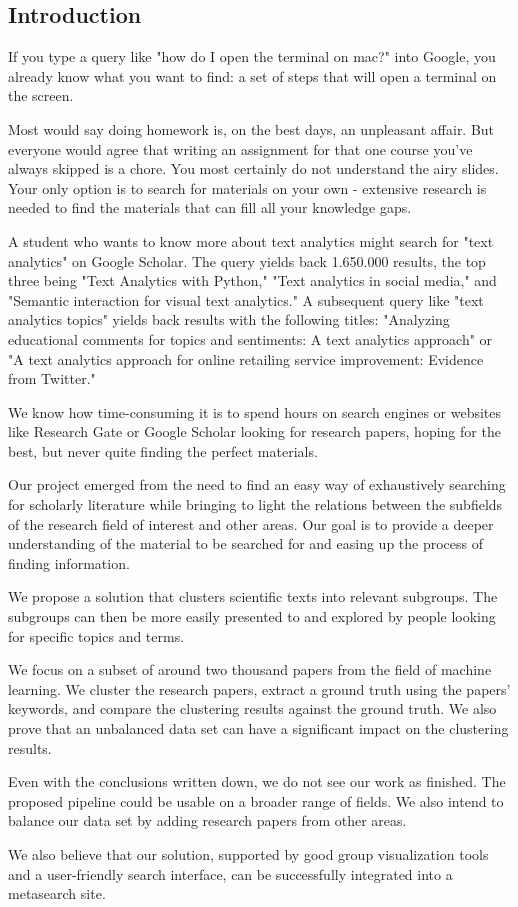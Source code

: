 \subsection{Introduction}

If you type a query like "how do I open the terminal on mac?" into Google, you already know what you want to find: a set of steps that will open a terminal on the screen.

Most would say doing homework is, on the best days, an unpleasant affair. But everyone would agree that writing an assignment for that one course you've always skipped is a chore. You most certainly do not understand the airy slides. Your only option is to search for materials on your own - extensive research is needed to find the materials that can fill all your knowledge gaps.

A student who wants to know more about text analytics might search for "text analytics" on Google Scholar. The query yields back 1.650.000 results, the top three being "Text Analytics with Python," "Text analytics in social media," and "Semantic interaction for visual text analytics." A subsequent query like "text analytics topics" yields back results with the following titles: "Analyzing educational comments for topics and sentiments: A text analytics approach" or "A text analytics approach for online retailing service improvement: Evidence from Twitter."

We know how time-consuming it is to spend hours on search engines or websites like Research Gate or Google Scholar looking for research papers, hoping for the best, but never quite finding the perfect materials.

Our project emerged from the need to find an easy way of exhaustively searching for scholarly literature while bringing to light the relations between the subfields of the research field of interest and other areas. Our goal is to provide a deeper understanding of the material to be searched for and easing up the process of finding information.

We propose a solution that clusters scientific texts into relevant subgroups. The subgroups can then be more easily presented to and explored by people looking for specific topics and terms.

We focus on a subset of around two thousand papers from the field of machine learning. We cluster the research papers, extract a ground truth using the papers' keywords, and compare the clustering results against the ground truth. We also prove that an unbalanced data set can have a significant impact on the clustering results. 

Even with the conclusions written down, we do not see our work as finished. The proposed pipeline could be usable on a broader range of fields. We also intend to balance our data set by adding research papers from other areas.

We also believe that our solution, supported by good group visualization tools and a user-friendly search interface, can be successfully integrated into a metasearch site.